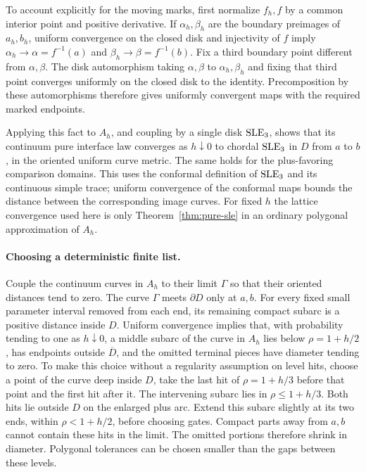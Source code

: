 To account explicitly for the moving marks, first normalize $f_h,f$ by
a common interior point and positive derivative.  If $\alpha_h,\beta_h$
are the boundary preimages of $a_h,b_h$, uniform convergence on the
closed disk and injectivity of $f$ imply
$\alpha_h\to\alpha=f^{-1}(a)$ and
$\beta_h\to\beta=f^{-1}(b)$.  Fix a third boundary point different
from $\alpha,\beta$.  The disk automorphism taking
$\alpha,\beta$ to $\alpha_h,\beta_h$ and fixing that third point
converges uniformly on the closed disk to the identity.  Precomposition
by these automorphisms therefore gives uniformly convergent maps with
the required marked endpoints.

Applying this fact to $A_h$, and coupling by a single disk $\operatorname{SLE}_3$,
shows that its continuum pure interface law converges as $h\downarrow0$
to chordal $\operatorname{SLE}_3$ in $D$ from $a$ to $b$, in the oriented uniform curve
metric.  The same holds for the plus-favoring comparison domains.  This
uses the conformal definition of $\operatorname{SLE}_3$ and its continuous simple trace;
uniform convergence of the conformal maps bounds the distance between
the corresponding image curves.  For fixed $h$ the lattice convergence
used here is only Theorem~\ref{thm:pure-sle} in an ordinary polygonal
approximation of $A_h$.

\paragraph{Choosing a deterministic finite list.}
Couple
the continuum curves in $A_h$ to their limit $\Gamma$ so that their
oriented distances tend to zero.  The curve $\Gamma$ meets $\partial D$
only at $a,b$.  For every fixed small parameter interval removed from
each end, its remaining compact subarc is a positive distance inside
$D$.  Uniform convergence implies that, with probability tending to one
as $h\downarrow0$, a middle subarc of the curve in $A_h$ lies below
$\rho=1+h/2$, has endpoints outside $\overline D$, and the omitted
terminal pieces have diameter tending to zero.  To make this choice
without a regularity assumption on level hits, choose a point of the
curve deep inside $D$, take the last hit of $\rho=1+h/3$ before that
point and the first hit after it.  The intervening subarc lies in
$\rho\leq1+h/3$.  Both hits lie outside $D$ on the enlarged plus arc.
Extend this subarc slightly at its two ends, within
$\rho<1+h/2$, before choosing gates.  Compact parts away from $a,b$
cannot contain these hits in the limit.  The omitted portions therefore
shrink in diameter.  Polygonal tolerances can be chosen smaller than the
gaps between these levels.

